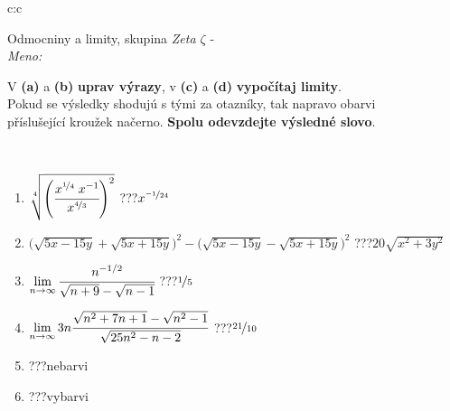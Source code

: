 \documentclass[10pt]{report}
\begin{document}
\newpage
\thispagestyle{empty}
\begin{tabular}{c:c}
\begin{minipage}[c][104.5mm][t]{0.5\linewidth}
\begin{center}
\vspace{7mm}
{\huge Odmocniny a limity, skupina \textit{Zeta $\zeta$} -}\\[5mm]
\textit{Meno:}\phantom{xxxxxxxxxxxxxxxxxxxxxxxxxxxxxxxxxxxxxxxxxxxxxxxxxxxxxxxxxxxxxxxxx}\\[5mm]
\begin{minipage}{0.95\linewidth}
\begin{center}
V \textbf{(a)} a \textbf{(b)} \textbf{uprav výrazy}, v \textbf{(c)} a \textbf{(d)} \textbf{vypočítaj limity}.\\Pokud se výsledky shodujú s tými za otazníky, tak napravo obarvi\\příslušející kroužek načerno. \textbf{Spolu odevzdejte výsledné slovo}.
\end{center}
\end{minipage}
\\[1mm]
\begin{minipage}{0.79\linewidth}
\begin{center}
\begin{varwidth}{\linewidth}
\begin{enumerate}
\small
\item $\sqrt[4]{\left(\cfrac{x^{\nicefrac{1}{4}}\;x^{-1}}{x^{\nicefrac{4}{3}}}\right)^{2}}$\quad \dotfill\; ???\;\dotfill \quad $x^{\nicefrac{-1}{24}}$
\item {\footnotesize{\scriptsize$\big(\sqrt{5x-15y}+\sqrt{5x+15y}\big)^2-\big(\sqrt{5x-15y}-\sqrt{5x+15y}\big)^2$}\quad \dotfill\; ???\;\dotfill \quad $20\sqrt{x^2+3y^2}$}
\item $\lim\limits_{n\to\infty}\cfrac{n^{-1/2}}{\sqrt{n+9}-\sqrt{n-1}}$\quad \dotfill\; ???\;\dotfill \quad $\nicefrac{1}{5}$
\item $\lim\limits_{n\to\infty}3n\cfrac{\sqrt{n^2+7n+1}-\sqrt{n^2-1}}{\sqrt{25n^2-n-2}}$\quad \dotfill\; ???\;\dotfill \quad $\nicefrac{21}{10}$
\item \quad \dotfill\; ???\;\dotfill \quad nebarvi
\item \quad \dotfill\; ???\;\dotfill \quad vybarvi
\end{enumerate}
\end{varwidth}
\end{center}
\end{minipage}
\begin{minipage}{0.20\linewidth}

\end{minipage}
\end{center}
\end{minipage}
\end{tabular}
\end{document}
